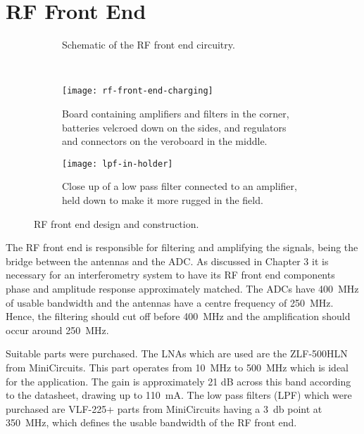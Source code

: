 \section{RF Front End}

\begin{figure}
  \centering
  \begin{subfigure}{\textwidth}
    \centering
    
    \caption{Schematic of the RF front end circuitry.}
  \end{subfigure}\\[1em]
  \begin{subfigure}{\textwidth}
    \centering
    \texttt{[image: rf-front-end-charging]}
    \caption{Board containing amplifiers and filters in the corner, batteries velcroed down on the sides, and regulators and connectors on the veroboard in the middle.}
  \end{subfigure}
  \begin{subfigure}{\textwidth}
    \centering
    \texttt{[image: lpf-in-holder]}
    \caption{Close up of a low pass filter connected to an amplifier, held down to make it more rugged in the field.}
  \end{subfigure}
  \caption{RF front end design and construction.}
  \label{fig:rf-front-end:circuit-board}
\end{figure}

The RF front end is responsible for filtering and amplifying the signals, being the bridge between the antennas and the ADC. As discussed in Chapter 3 it is necessary for an interferometry system to have its RF front end components phase and amplitude response approximately matched.
The ADCs have \SI{400}{\mega\hertz} of usable bandwidth and the antennas have a centre frequency of \SI{250}{\mega\hertz}. Hence, the filtering should cut off before \SI{400}{\mega\hertz} and the amplification should occur around \SI{250}{\mega\hertz}. 

Suitable parts were purchased. The LNAs which are used are the ZLF-500HLN from MiniCircuits. This part operates from \SI{10}{\mega\hertz} to \SI{500}{\mega\hertz} which is ideal for the application. The gain is approximately 21 dB across this band according to the datasheet, drawing up to \SI{110}{\milli\ampere}.  The low pass filters (LPF) which were purchased are VLF-225+ parts from MiniCircuits having a \SI{3}{\decibel} point at \SI{350}{\mega\hertz}, which defines the usable bandwidth of the RF front end.

